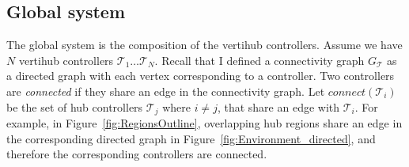 




\subsection{Global system}
The global system is the composition of the vertihub controllers. Assume we have $N$ vertihub controllers $\mathcal{T}_1 \dots \mathcal{T}_N$. Recall that I defined a connectivity graph $G_{\mathcal{T}}$ as a directed graph with each vertex corresponding to a controller. Two controllers are \emph{connected} if they share an edge in the connectivity graph. Let $connect(\mathcal T_i)$ be the set of hub controllers $\mathcal{T}_j$ where $i \neq j$, that share an edge with $\mathcal{T}_i$. For example, in Figure~\ref{fig:RegionsOutline}, overlapping hub regions share an edge in the corresponding directed graph in Figure~\ref{fig:Environment_directed}, and therefore the corresponding controllers are connected. 

